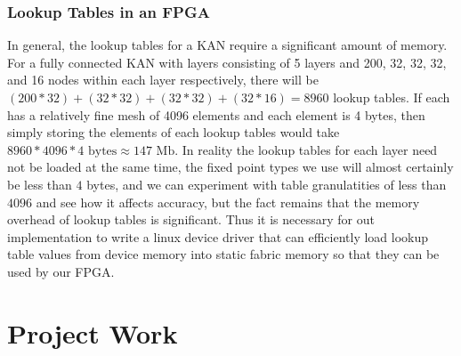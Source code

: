 \documentclass{article}
\begin{document}
\subsubsection{Lookup Tables in an FPGA}
In general, the lookup tables for a KAN require a significant amount of memory. For a fully connected KAN with layers consisting of 5 layers and 200, 32, 32, 32, and 16 nodes within each layer respectively, there will be $(200 * 32) + (32 * 32) + (32 * 32) + (32 * 16) = 8960$ lookup tables. If each has a relatively fine mesh of 4096 elements and each element is 4 bytes, then simply storing the elements of each lookup tables would take $8960 * 4096 * 4 \text{ bytes} \approx 147 \text{ Mb}$. In reality the lookup tables for each layer need not be loaded at the same time, the fixed point types we use will almost certainly be less than $4$ bytes, and we can experiment with table granulatities of less than $4096$ and see how it affects accuracy, but the fact remains that the memory overhead of lookup tables is significant. Thus it is necessary for out implementation to write a linux device driver that can efficiently load lookup table values from device memory into static fabric memory so that they can be used by our FPGA.


\section{Project Work}
\end{document}
